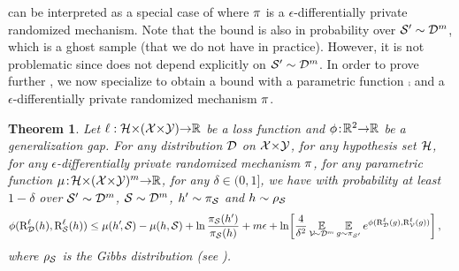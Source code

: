 \documentclass[twoside]{article}
\theoremstyle{plain}
\newtheorem{theorem}{Theorem}
\begin{document}
 can be interpreted as a special case of  where $\P$ is a $\epsilon$-differentially private randomized mechanism.
Note that the bound is also in probability over $\Scal'\sim\Dcal^{m}$, which is a ghost sample (that we do not have in practice).
However, it is not problematic since  does not depend explicitly on $\Scal'\sim\Dcal^{m}$.
In order to prove further , we now specialize  to obtain a bound with a parametric function $\comp$ and a $\epsilon$-differentially private randomized mechanism $\P$.

\begin{theorem}\label{theorem:general-disintegrated-differential-privacy}
Let $\loss: \Hcal{\times}(\Xcal{\times}\Ycal){\to}\R$ be a loss function and $\phi\!:\! \R^2{\to}\R$ be a generalization gap.
For any distribution $\Dcal$ on $\Xcal{\times}\Ycal$, for any hypothesis set $\Hcal$, for any $\epsilon$-differentially private randomized mechanism $\P$, for any parametric function $\comp\!:\! \Hcal{\times}(\Xcal{\times}\Ycal)^m{\to}\R$, for any $\delta\!\in\!(0, 1]$, we have with probability at least $1-\delta$ over $\Scal'\sim\Dcal^m$, $\Scal\sim\Dcal^m$, $h'\sim\P_{\Scal}$ and $h\sim\AQ$
\begin{align*}
    \phi(\RiskLoss_{\Dcal}(h), \RiskLoss_{\Scal}(h)) &\le \comp(h'\!,\Scal) - \comp(h,\Scal) + \ln\frac{\P_{\Scal}(h')}{\P_{\Scal}(h)} + m\epsilon + \ln\!\left[\frac{4}{\delta^2} \EE_{\Vcal\!{\sim}\Dcal^m}\EE_{g{\sim}\P_{\Scal'}} e^{\phi(\RiskLoss_{\Dcal}(g),\RiskLoss_{\Vcal}(g))}\right],
\end{align*}
where $\AQ$ is the Gibbs distribution (see ).
\end{theorem}
\end{document}
